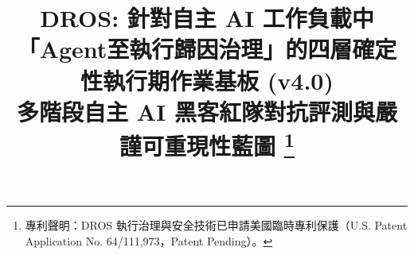 \documentclass[conference]{IEEEtran}
\begin{document}
\title{DROS: 針對自主 AI 工作負載中「Agent至執行歸因治理」的四層確定性執行期作業基板 (v4.0)\\
\large 多階段自主 AI 黑客紅隊對抗評測與嚴謹可重現性藍圖
\thanks{專利聲明：DROS 執行治理與安全技術已申請美國臨時專利保護（U.S. Patent Application No. 64/111,973，Patent Pending）。}
}

\author{
}

\maketitle
\end{document}
